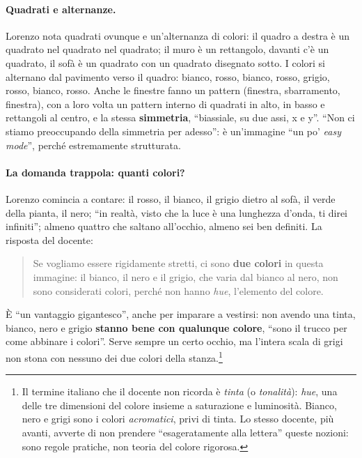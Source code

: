 \paragraph{Quadrati e alternanze.} Lorenzo nota quadrati ovunque e un'alternanza di
colori: il quadro a destra è un quadrato nel quadrato nel quadrato; il muro è un
rettangolo, davanti c'è un quadrato, il sofà è un quadrato con un quadrato disegnato
sotto. I colori si alternano dal pavimento verso il quadro: bianco, rosso, bianco,
rosso, grigio, rosso, bianco, rosso. Anche le finestre fanno un pattern (finestra,
sbarramento, finestra), con a loro volta un pattern interno di quadrati in alto, in basso
e rettangoli al centro, e la stessa \textbf{simmetria}, ``biassiale, su due assi, x e
y''. ``Non ci stiamo preoccupando della simmetria per adesso'': è un'immagine ``un po'
\emph{easy mode}'', perché estremamente strutturata.

\paragraph{La domanda trappola: quanti colori?} Lorenzo comincia a contare: il rosso, il
bianco, il grigio dietro al sofà, il verde della pianta, il nero; ``in realtà, visto che
la luce è una lunghezza d'onda, ti direi infiniti''; almeno quattro che saltano
all'occhio, almeno sei ben definiti. La risposta del docente:
\begin{quote}
Se vogliamo essere rigidamente stretti, ci sono \textbf{due colori} in questa immagine:
il bianco, il nero e il grigio, che varia dal bianco al nero, non sono considerati
colori, perché non hanno \emph{hue}, l'elemento del colore.
\end{quote}
È ``un vantaggio gigantesco'', anche per imparare a vestirsi: non avendo una tinta,
bianco, nero e grigio \textbf{stanno bene con qualunque colore}, ``sono il trucco per
come abbinare i colori''. Serve sempre un certo occhio, ma l'intera scala di grigi non
stona con nessuno dei due colori della stanza.\footnote{Il termine italiano che il
docente non ricorda è \emph{tinta} (o \emph{tonalità}): \emph{hue}, una delle tre
dimensioni del colore insieme a saturazione e luminosità. Bianco, nero e grigi sono i
colori \emph{acromatici}, privi di tinta. Lo stesso docente, più avanti, avverte di non
prendere ``esageratamente alla lettera'' queste nozioni: sono regole pratiche, non
teoria del colore rigorosa.}

